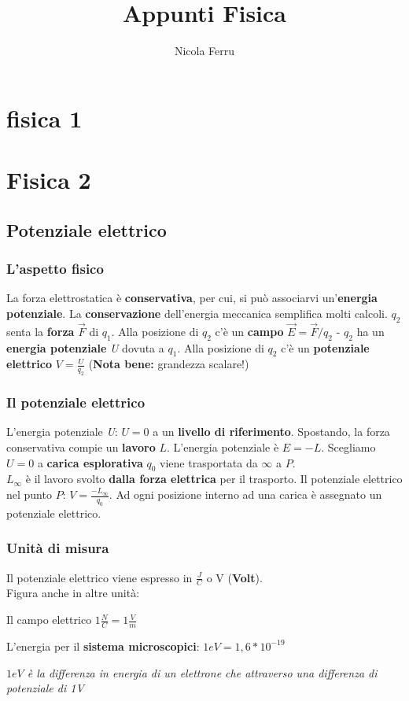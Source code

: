 \documentclass{book}
\title{Appunti Fisica}
\author{Nicola Ferru}
\date{}
\begin{document}
\maketitle
\tableofcontents
\listoftables
\listoffigures


\part{fisica 1}



\part {Fisica 2}




\chapter{Potenziale elettrico}
\section{L'aspetto fisico}
La forza elettrostatica è \textbf{conservativa}, per cui, si può associarvi un'\textbf{energia potenziale}. La \textbf{conservazione} dell'energia meccanica semplifica molti calcoli. $q_2$ senta la \textbf{forza} $\vec{F}$ di $q_1$. Alla posizione di $q_2$ c'è un \textbf{campo} $\vec{E}=\vec{F}/q_2$ - $q_2$ ha un \textbf{energia potenziale} \textit{U} dovuta a $q_1$. Alla posizione di $q_2$ c'è un \textbf{potenziale elettrico} $V=\frac{U}{q_2}$ (\textbf{Nota bene:} grandezza scalare!)
\section{Il potenziale elettrico}
L'energia potenziale \textit{U}: $U=0$ a un \textbf{livello di riferimento}. Spostando, la forza conservativa compie un \textbf{lavoro} $L$. L'energia potenziale è $E=-L$. Scegliamo $U=0$ a \textbf{carica esplorativa} $q_0$ viene trasportata da $\infty$ a $P$.\\
$L_\infty$ è il lavoro svolto \textbf{dalla forza elettrica} per il trasporto. Il potenziale elettrico nel punto $P$: $V=\frac{-L_\infty}{q_0}$. Ad ogni posizione interno ad una carica è assegnato un potenziale elettrico.
\section{Unità di misura}
Il potenziale elettrico viene espresso in $\frac{J}{C}$ o V (\textbf{Volt}).\\
Figura anche in altre unità:
\begin{center}
  Il campo elettrico $1\frac{N}{C}=1\frac{V}{m}$
\end{center}
L'energia per il \textbf{sistema microscopici}: $1eV=1,6*10^{-19}$
\begin{center}
  \textit{\color{blue} $1eV$ è la differenza in energia di un elettrone che attraverso una differenza di potenziale di 1V}
\end{center}
\end{document}
